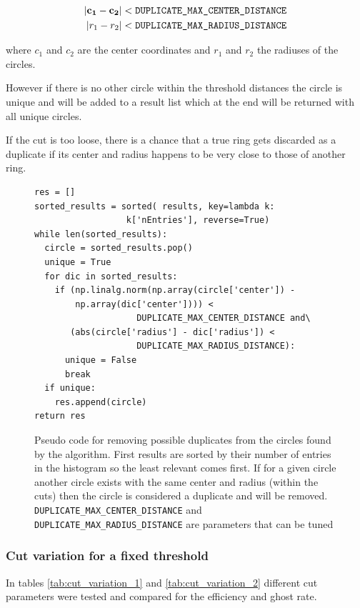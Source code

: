 \documentclass[11pt,twoside]{scrreprt}
\begin{document}
\begin{equation}
\begin{aligned}
\left|\mathbf{c_1}-\mathbf{c_2}\right| &< \text{\texttt{DUPLICATE\_MAX\_CENTER\_DISTANCE}}\\
\left|r_1 - r_2\right| &< \text{\texttt{DUPLICATE\_MAX\_RADIUS\_DISTANCE}}
\end{aligned}
\label{eq:cut1}
\end{equation}

where $c_1$ and $c_2$ are the center coordinates and $r_1$ and $r_2$ the radiuses of the circles.

However if there is no other circle within the threshold distances the circle is unique and will be added to a result list which 
at the end will be returned with all unique circles. 

If the cut is too loose, there is a chance that a true ring gets discarded as a duplicate if its center and radius happens to be very 
close to those of another ring.

\begin{figure}[htb]
\centering
  \begin{lstlisting}
res = []
sorted_results = sorted( results, key=lambda k: 
                  k['nEntries'], reverse=True)
while len(sorted_results):
  circle = sorted_results.pop()
  unique = True
  for dic in sorted_results:
    if (np.linalg.norm(np.array(circle['center']) - 
        np.array(dic['center']))) < 
                    DUPLICATE_MAX_CENTER_DISTANCE and\
       (abs(circle['radius'] - dic['radius']) < 
                    DUPLICATE_MAX_RADIUS_DISTANCE):
      unique = False
      break
  if unique:
    res.append(circle)
return res
\end{lstlisting}
\caption[Pseudo code for removing possible duplicates]{Pseudo code for removing possible duplicates from the circles found by the algorithm. First results are sorted by their number of entries
in the histogram so the least relevant comes first. If for a given circle another circle exists with the same center and radius (within the cuts)
then the circle is considered a duplicate and will be removed. \texttt{DUPLICATE\_MAX\_CENTER\_DISTANCE} and \texttt{DUPLICATE\_MAX\_RADIUS\_DISTANCE} are 
parameters that can be tuned}\label{pc:dup_code}
\end{figure}

\subsubsection{Cut variation for a fixed threshold} %
\label{ssub:cut_variation_for_a_fixed_threshold}
In tables \ref{tab:cut_variation_1} and \ref{tab:cut_variation_2} different cut parameters were tested
and compared for the efficiency and ghost rate.
\end{document}
